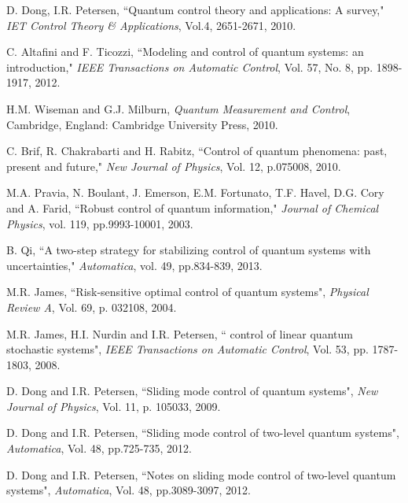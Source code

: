 \documentclass[letterpaper, 10 pt, conference]{ieeeconf}
\begin{document}
\begin{thebibliography}{99}


D. Dong, I.R. Petersen, ``Quantum control theory and
applications: A survey," {\em IET Control Theory \& Applications},
Vol.4, 2651-2671, 2010.

C. Altafini and F. Ticozzi, ``Modeling and control of quantum
systems: an introduction," {\em IEEE Transactions on Automatic
Control}, Vol. 57, No. 8, pp. 1898-1917, 2012.

H.M. Wiseman and G.J. Milburn, {\em Quantum Measurement and
Control}, Cambridge, England: Cambridge University Press, 2010.

C. Brif, R. Chakrabarti and H. Rabitz, ``Control of quantum
phenomena: past, present and future," {\em New Journal of Physics},
Vol. 12, p.075008, 2010.








M.A. Pravia, N. Boulant, J. Emerson, E.M. Fortunato, T.F. Havel,
D.G. Cory and A. Farid, ``Robust control of quantum information,"
{\em Journal of Chemical Physics}, vol. 119, pp.9993-10001, 2003.

B. Qi, ``A two-step strategy for stabilizing control of quantum systems with uncertainties,"
{\em Automatica}, vol. 49, pp.834-839, 2013.

M.R. James, ``Risk-sensitive optimal control of quantum systems",
\emph{Physical Review A}, Vol. 69, p. 032108, 2004.

M.R. James, H.I. Nurdin and I.R. Petersen, `` control of
linear quantum stochastic systems", \emph{IEEE Transactions on
Automatic Control}, Vol. 53, pp. 1787-1803, 2008.

D. Dong and I.R. Petersen, ``Sliding mode control of quantum
systems", \emph{New Journal of Physics}, Vol. 11, p. 105033, 2009.

D. Dong and I.R. Petersen, ``Sliding mode control of two-level
quantum systems", \emph{Automatica}, Vol. 48, pp.725-735, 2012.

D. Dong and I.R. Petersen, ``Notes on sliding mode control of two-level
quantum systems", \emph{Automatica}, Vol. 48, pp.3089-3097, 2012.


\end{thebibliography}
\end{document}
